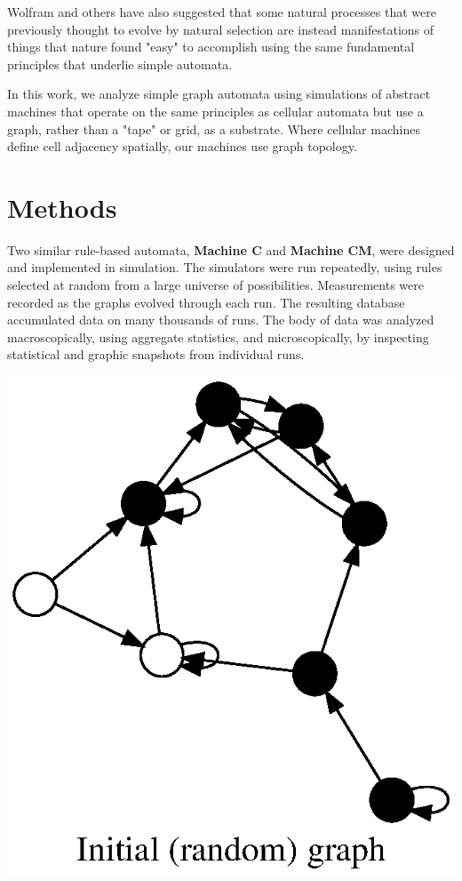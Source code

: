 \documentclass{tufte-handout}
\begin{document}
Wolfram and others have also suggested that some natural processes that were
previously thought to evolve by natural selection are instead
manifestations of things that nature found "easy" to accomplish using
the same fundamental principles that underlie simple automata.

In this work, we analyze simple graph automata using simulations of abstract
machines that operate on the same principles as
cellular automata but use a graph, rather than a "tape" or grid, as a substrate.
Where cellular machines define cell adjacency spatially, our machines use graph topology.


\section{Methods}

Two similar rule-based automata, \textbf{Machine C} and \textbf{Machine CM}, were designed
and implemented in simulation. The simulators were run repeatedly, using rules
selected at random from a large universe of possibilities. Measurements were recorded as the graphs
evolved through each run. The resulting database accumulated data on many thousands of runs. The body of data
was analyzed macroscopically, using aggregate statistics, and microscopically, by inspecting
statistical and graphic snapshots from individual runs.

\begin{marginfigure}
\includegraphics{5iters_0.ps}
\end{marginfigure}
\end{document}
